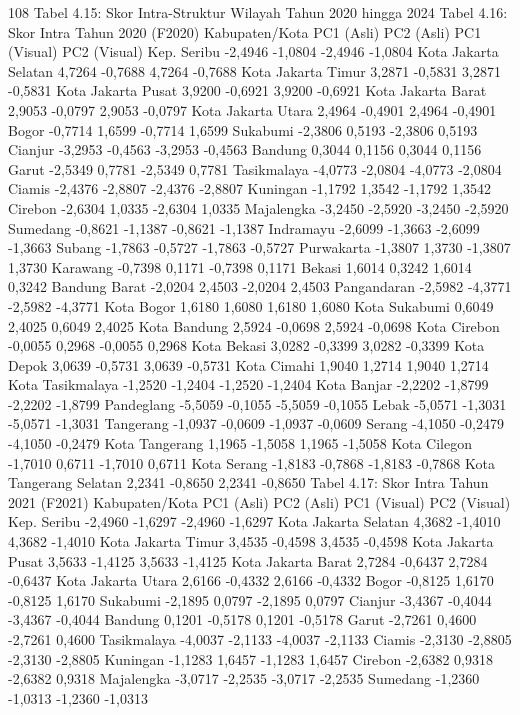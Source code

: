 108
Tabel 4.15: Skor Intra-Struktur Wilayah Tahun 2020 hingga 2024
Tabel 4.16: Skor Intra Tahun
2020 (F2020)
Kabupaten/Kota PC1 (Asli) PC2 (Asli) PC1 (Visual) PC2 (Visual) Kep. Seribu -2,4946 -1,0804 -2,4946 -1,0804 Kota Jakarta Selatan 4,7264 -0,7688 4,7264 -0,7688 Kota Jakarta Timur 3,2871 -0,5831 3,2871 -0,5831 Kota Jakarta Pusat 3,9200 -0,6921 3,9200 -0,6921 Kota Jakarta Barat 2,9053 -0,0797 2,9053 -0,0797 Kota Jakarta Utara 2,4964 -0,4901 2,4964 -0,4901 Bogor -0,7714 1,6599 -0,7714 1,6599 Sukabumi -2,3806 0,5193 -2,3806 0,5193 Cianjur -3,2953 -0,4563 -3,2953 -0,4563 Bandung 0,3044 0,1156 0,3044 0,1156 Garut -2,5349 0,7781 -2,5349 0,7781 Tasikmalaya -4,0773 -2,0804 -4,0773 -2,0804 Ciamis -2,4376 -2,8807 -2,4376 -2,8807 Kuningan -1,1792 1,3542 -1,1792 1,3542 Cirebon -2,6304 1,0335 -2,6304 1,0335 Majalengka -3,2450 -2,5920 -3,2450 -2,5920 Sumedang -0,8621 -1,1387 -0,8621 -1,1387
Indramayu -2,6099 -1,3663 -2,6099 -1,3663 Subang -1,7863 -0,5727 -1,7863 -0,5727 Purwakarta -1,3807 1,3730 -1,3807 1,3730 Karawang -0,7398 0,1171 -0,7398 0,1171 Bekasi 1,6014 0,3242 1,6014 0,3242 Bandung Barat -2,0204 2,4503 -2,0204 2,4503 Pangandaran -2,5982 -4,3771 -2,5982 -4,3771 Kota Bogor 1,6180 1,6080 1,6180 1,6080 Kota Sukabumi 0,6049 2,4025 0,6049 2,4025 Kota Bandung 2,5924 -0,0698 2,5924 -0,0698 Kota Cirebon -0,0055 0,2968 -0,0055 0,2968 Kota Bekasi 3,0282 -0,3399 3,0282 -0,3399 Kota Depok 3,0639 -0,5731 3,0639 -0,5731 Kota Cimahi 1,9040 1,2714 1,9040 1,2714 Kota Tasikmalaya -1,2520 -1,2404 -1,2520 -1,2404 Kota Banjar -2,2202 -1,8799 -2,2202 -1,8799 Pandeglang -5,5059 -0,1055 -5,5059 -0,1055 Lebak -5,0571 -1,3031 -5,0571 -1,3031 Tangerang -1,0937 -0,0609 -1,0937 -0,0609 Serang -4,1050 -0,2479 -4,1050 -0,2479 Kota Tangerang 1,1965 -1,5058 1,1965 -1,5058 Kota Cilegon -1,7010 0,6711 -1,7010 0,6711 Kota Serang -1,8183 -0,7868 -1,8183 -0,7868 Kota Tangerang Selatan 2,2341 -0,8650 2,2341 -0,8650
Tabel 4.17: Skor Intra Tahun
2021 (F2021)
Kabupaten/Kota PC1 (Asli) PC2 (Asli) PC1 (Visual) PC2 (Visual) Kep. Seribu -2,4960 -1,6297 -2,4960 -1,6297 Kota Jakarta Selatan 4,3682 -1,4010 4,3682 -1,4010 Kota Jakarta Timur 3,4535 -0,4598 3,4535 -0,4598 Kota Jakarta Pusat 3,5633 -1,4125 3,5633 -1,4125 Kota Jakarta Barat 2,7284 -0,6437 2,7284 -0,6437 Kota Jakarta Utara 2,6166 -0,4332 2,6166 -0,4332 Bogor -0,8125 1,6170 -0,8125 1,6170 Sukabumi -2,1895 0,0797 -2,1895 0,0797 Cianjur -3,4367 -0,4044 -3,4367 -0,4044 Bandung 0,1201 -0,5178 0,1201 -0,5178 Garut -2,7261 0,4600 -2,7261 0,4600 Tasikmalaya -4,0037 -2,1133 -4,0037 -2,1133 Ciamis -2,3130 -2,8805 -2,3130 -2,8805 Kuningan -1,1283 1,6457 -1,1283 1,6457 Cirebon -2,6382 0,9318 -2,6382 0,9318 Majalengka -3,0717 -2,2535 -3,0717 -2,2535 Sumedang -1,2360 -1,0313 -1,2360 -1,0313
